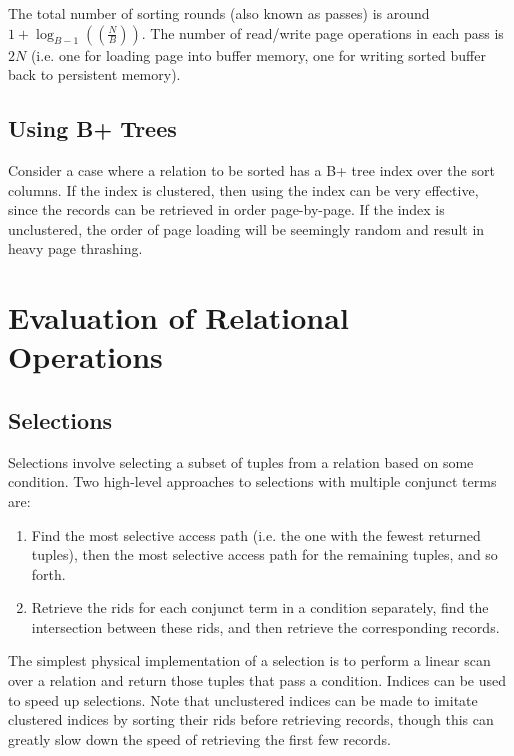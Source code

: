 \documentclass[12pt,titlepage]{article}
\let\stdsection\section
\renewcommand\section{\clearpage\stdsection}
\begin{document}
      The total number of sorting rounds (also known as passes) is around $1 + \log_{B-1}((\frac{N}{B}))$. The number of read/write page operations in each
      pass is $2N$ (i.e. one for loading page into buffer memory, one for writing sorted buffer back to persistent memory).

    \subsection{Using B+ Trees}
      Consider a case where a relation to be sorted has a B+ tree index over the sort columns. If the index is clustered, then using the index can be very
      effective, since the records can be retrieved in order page-by-page. If the index is unclustered, the order of page loading will be seemingly random
      and result in heavy page thrashing.

  \section{Evaluation of Relational Operations}

    \subsection{Selections}
      Selections involve selecting a subset of tuples from a relation based on some condition. Two high-level approaches to selections with multiple conjunct
      terms are:

      \begin{enumerate}
        \item Find the most selective access path (i.e. the one with the fewest returned tuples), then the most selective access path for the remaining
          tuples, and so forth.
        \item Retrieve the rids for each conjunct term in a condition separately, find the intersection between these rids, and then retrieve the corresponding
          records.
      \end{enumerate}

      The simplest physical implementation of a selection is to perform a linear scan over a relation and return those tuples that pass a condition. Indices can
      be used to speed up selections. Note that unclustered indices can be made to imitate clustered indices by sorting their rids before retrieving records, though
      this can greatly slow down the speed of retrieving the first few records.
\end{document}
